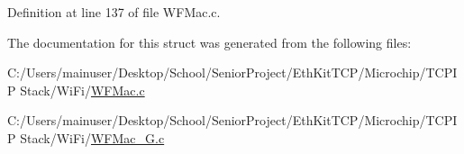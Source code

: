 Definition at line 137 of file W\+F\+Mac.\+c.



The documentation for this struct was generated from the following files\+:\begin{DoxyCompactItemize}
\item 
C\+:/\+Users/mainuser/\+Desktop/\+School/\+Senior\+Project/\+Eth\+Kit\+T\+C\+P/\+Microchip/\+T\+C\+P\+I\+P Stack/\+Wi\+Fi/\hyperlink{_w_f_mac_8c}{W\+F\+Mac.\+c}\item 
C\+:/\+Users/mainuser/\+Desktop/\+School/\+Senior\+Project/\+Eth\+Kit\+T\+C\+P/\+Microchip/\+T\+C\+P\+I\+P Stack/\+Wi\+Fi/\hyperlink{_w_f_mac__24_g_8c}{W\+F\+Mac\+\_\+G.\+c}\end{DoxyCompactItemize}
